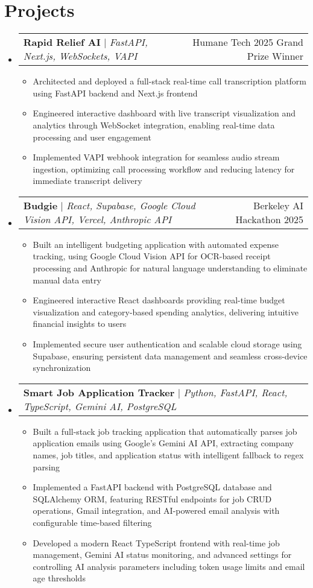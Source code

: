 \documentclass[letterpaper,11pt]{article}
\makeatletter
\newcommand{\resumeItem}[1]{
  \item\small{
    {#1 \vspace{-2pt}}
  }
}
\newcommand{\resumeProjectHeading}[2]{
    \item
    \begin{tabular*}{0.97\textwidth}{l@{\extracolsep{\fill}}r}
      \small#1 & #2 \\
    \end{tabular*}\vspace{-7pt}
}
\newcommand{\resumeSubHeadingListStart}{\begin{itemize}[leftmargin=0.15in, label={}]}
\newcommand{\resumeSubHeadingListEnd}{\end{itemize}}
\newcommand{\resumeItemListStart}{\begin{itemize}}
\newcommand{\resumeItemListEnd}{\end{itemize}\vspace{-5pt}}
\makeatother
\begin{document}
\section{Projects}
    \resumeSubHeadingListStart
      \resumeProjectHeading
          {\textbf{Rapid Relief AI} $|$ \emph{FastAPI, Next.js, WebSockets, VAPI}}{Humane Tech 2025 Grand Prize Winner}
          \resumeItemListStart
            \resumeItem{Architected and deployed a full-stack real-time call transcription platform using FastAPI backend and Next.js frontend}
            \resumeItem{Engineered interactive dashboard with live transcript visualization and analytics through WebSocket integration, enabling real-time data processing and user engagement}
            \resumeItem{Implemented VAPI webhook integration for seamless audio stream ingestion, optimizing call processing workflow and reducing latency for immediate transcript delivery}
          \resumeItemListEnd
      \resumeProjectHeading
          {\textbf{Budgie} $|$ \emph{React, Supabase, Google Cloud Vision API, Vercel, Anthropic API}}{Berkeley AI Hackathon 2025}
          \resumeItemListStart
            \resumeItem{Built an intelligent budgeting application with automated expense tracking, using Google Cloud Vision API for OCR-based receipt processing and Anthropic for natural language understanding to eliminate manual data entry}
            \resumeItem{Engineered interactive React dashboards providing real-time budget visualization and category-based spending analytics, delivering intuitive financial insights to users}
            \resumeItem{Implemented secure user authentication and scalable cloud storage using Supabase, ensuring persistent data management and seamless cross-device synchronization}
          \resumeItemListEnd
      \resumeProjectHeading
          {\textbf{Smart Job Application Tracker} $|$ \emph{Python, FastAPI, React, TypeScript, Gemini AI, PostgreSQL}}{}
          \resumeItemListStart
            \resumeItem{Built a full-stack job tracking application that automatically parses job application emails using Google's Gemini AI API, extracting company names, job titles, and application status with intelligent fallback to regex parsing}
            \resumeItem{Implemented a FastAPI backend with PostgreSQL database and SQLAlchemy ORM, featuring RESTful endpoints for job CRUD operations, Gmail integration, and AI-powered email analysis with configurable time-based filtering}
            \resumeItem{Developed a modern React TypeScript frontend with real-time job management, Gemini AI status monitoring, and advanced settings for controlling AI analysis parameters including token usage limits and email age thresholds}
          \resumeItemListEnd
    \resumeSubHeadingListEnd
\end{document}
